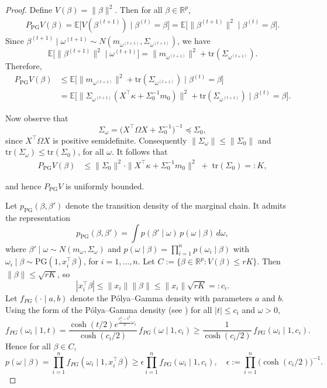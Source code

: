 \documentclass[ejsv2, noshowframe]{imsart}
\theoremstyle{plain}
\theoremstyle{definition}
\theoremstyle{remark}
\newcommand{\tr}{\text{tr}}
\newcommand{\R}{\mathbb{R}}
\newcommand{\E}{\mathbb{E}}
\renewcommand{\P}{P}
\begin{document}
\begin{proof}
Define $V(\beta) = \|\beta\|^2$. Then for all $\beta \in \R^p$,
\begin{align*}
\P_{\mathrm{PG}} V(\beta)
= \E\big[ V(\beta^{(t+1)}) \mid \beta^{(t)} = \beta \big] 
= \E\big[ \|\beta^{(t+1)}\|^2 \mid \beta^{(t)} = \beta \big].
\end{align*}
Since $\beta^{(t+1)} \mid \omega^{(t+1)} \sim N(m_{\omega^{(t+1)}}, \Sigma_{\omega^{(t+1)}})$, we have
\[
\E\big[ \|\beta^{(t+1)}\|^2 \mid \omega^{(t+1)} \big]
= \|m_{\omega^{(t+1)}}\|^2 + \tr(\Sigma_{\omega^{(t+1)}}).
\]
Therefore,
\begin{align*}
\P_{\mathrm{PG}} V(\beta)
&\le \E\big[ \|m_{\omega^{(t+1)}}\|^2 + \tr(\Sigma_{\omega^{(t+1)}}) \mid \beta^{(t)} = \beta \big] \\
&= \E\big[ \|\Sigma_{\omega^{(t+1)}} (X^\top \kappa + \Sigma_0^{-1} m_0)\|^2 
+ \tr(\Sigma_{\omega^{(t+1)}}) \mid \beta^{(t)} = \beta \big].
\end{align*}

\noindent
Now observe that
\[
\Sigma_{\omega} = \big(X^\top \Omega X + \Sigma_0^{-1}\big)^{-1}
\preceq \Sigma_0,
\]
since $X^\top \Omega X$ is positive semidefinite. Consequently 
$\|\Sigma_{\omega}\| \le \|\Sigma_0\|$ and $\tr(\Sigma_{\omega}) 
\le \tr(\Sigma_0)$, for all $\omega$. It follows that
\begin{align*}
\P_{\mathrm{PG}} V(\beta)
&\le \|\Sigma_0\|^2 \cdot \|X^\top \kappa + \Sigma_0^{-1} m_0\|^2
\;+\; \tr(\Sigma_0) =: K, 
\end{align*}

\noindent
and hence $\P_{\mathrm{PG}} V$ is uniformly bounded. 

Let $p_{\mathrm{PG}}(\beta, \beta')$ denote the transition density of the marginal chain. It admits the representation
\[
p_{\mathrm{PG}}(\beta, \beta')
= \int p(\beta' \mid \omega)\, p(\omega \mid \beta)\, d\omega,
\]
where $\beta' \mid \omega \sim N(m_\omega, \Sigma_\omega)$ and $p(\omega \mid \beta) = \prod_{i=1}^n p(\omega_i \mid \beta)$ with $\omega_i \mid \beta \sim \mathrm{PG}(1, x_i^\top \beta)$, for $i=1,\dots,n$. Let $C := \{\beta \in \R^p : V(\beta) \le rK\}$. Then $\|\beta\|\le \sqrt{rK}$, so
\[
|x_i^\top \beta| \le \|x_i\| \|\beta\| \le \|x_i\|\sqrt{rK} =: c_i. 
\]
Let $f_{PG}(\cdot \mid a, b)$ denote the P\'olya--Gamma density with parameters $a$ and $b$. Using the form of the P\'olya--Gamma density (see \cite[Section 2]{PolsonScottWindle2013}) for all $|t|\le c_i$ and $\omega>0$,
\[
f_{PG}(\omega_i \mid 1,t) = \frac{\cosh(t/2) e^{\frac{c_i^2-t^2}{2} \omega_i}}{\cosh(c_i/2)}\, f_{PG}(\omega \mid 1,c_i) \ge \frac{1}{\cosh(c_i/2)}\, f_{PG}(\omega_i \mid 1,c_i).
\]
Hence for all $\beta \in C$,
\[
p(\omega \mid \beta)
= \prod_{i=1}^n f_{PG} (\omega_i \mid 1, x_i^\top \beta)
\ge \epsilon \prod_{i=1}^n f_{PG} (\omega_i \mid 1,c_i),
\quad
\epsilon := \prod_{i=1}^n \big(\cosh(c_i/2)\big)^{-1}.
\]


\end{proof}
\end{document}
